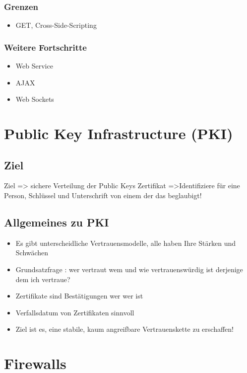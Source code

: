 \subsubsection*{ Grenzen }
\begin{itemize}
	\item GET, Cross-Side-Scripting
\end{itemize}

\subsubsection*{ Weitere Fortschritte }
\begin{itemize}
	\item Web Service
	\item AJAX
	\item Web Sockets
\end{itemize}


\section*{Public Key Infrastructure (PKI)}
\subsection*{ Ziel}
Ziel 			=> sichere Verteilung der Public Keys
Zertifikat	 =>Identifiziere für eine Person, Schlüssel und Unterschrift von einem der das beglaubigt!

\subsection*{Allgemeines zu PKI}
\begin{itemize}
\item Es gibt unterscheidliche Vertrauensmodelle, alle haben Ihre Stärken und Schwächen
\item Grundsatzfrage : wer vertraut wem und wie vertrauenswürdig ist derjenige dem ich vertraue?
\item Zertifikate sind Bestätigungen wer wer ist
\item Verfallsdatum von Zertifikaten sinnvoll
\item Ziel ist es, eine stabile, kaum angreifbare Vertrauenskette zu erschaffen!
\end{itemize}

\section*{Firewalls}


